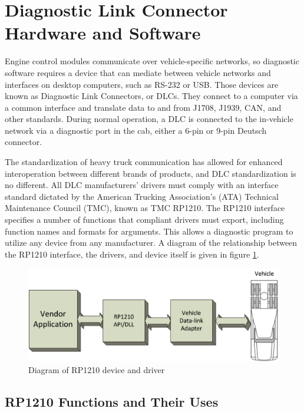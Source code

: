 \section{Diagnostic Link Connector Hardware and Software}

Engine control modules communicate over vehicle-specific networks, so diagnostic software requires a device that can mediate between
vehicle networks and interfaces on desktop computers, such as RS-232 or USB. Those devices are known as Diagnostic Link Connectors, or DLCs.
They connect to a computer via a common interface and translate data to and from J1708, J1939, CAN, and other standards. During normal
operation, a DLC is connected to the in-vehicle network via a diagnostic port in the cab, either a 6-pin or 9-pin Deutsch connector.

The standardization of heavy truck communication has allowed for enhanced interoperation between different brands of products, and DLC
standardization is no different. All DLC manufacturers' drivers must comply with an interface standard dictated by the American Trucking Association's (ATA)
Technical Maintenance Council (TMC), known as TMC RP1210\cite{RP1210}. The RP1210 interface specifies a number of functions that compliant drivers must export,
including function names and formats for arguments. This allows a diagnostic program to utilize any device from any manufacturer. A diagram of the relationship between
the RP1210 interface, the drivers, and device itself is given in figure \ref{fig:rp1210}.

\begin{figure}[h]
  \centering
  \includegraphics{RP1210}
  \caption{Diagram of RP1210 device and driver}
  \label{fig:rp1210}
\end{figure}

\subsection{RP1210 Functions and Their Uses}

